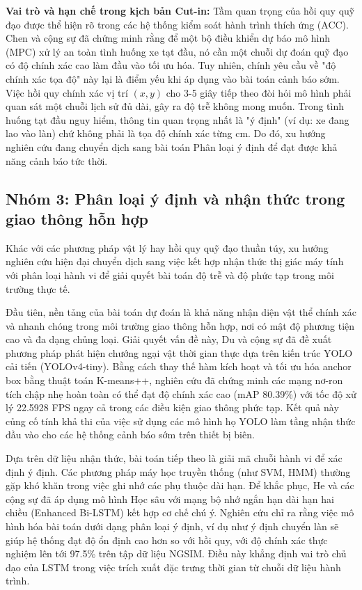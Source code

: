 	\textbf{Vai trò và hạn chế trong kịch bản Cut-in:}
	Tầm quan trọng của hồi quy quỹ đạo được thể hiện rõ trong các hệ thống kiểm soát hành trình thích ứng (ACC). Chen và cộng sự \cite{Chen2021} đã chứng minh rằng để một bộ điều khiển dự báo mô hình (MPC) xử lý an toàn tình huống xe tạt đầu, nó cần một chuỗi dự đoán quỹ đạo có độ chính xác cao làm đầu vào tối ưu hóa.
	Tuy nhiên, chính yêu cầu về "độ chính xác tọa độ" này lại là điểm yếu khi áp dụng vào bài toán cảnh báo sớm. Việc hồi quy chính xác vị trí $(x, y)$ cho 3-5 giây tiếp theo đòi hỏi mô hình phải quan sát một chuỗi lịch sử đủ dài, gây ra độ trễ không mong muốn. Trong tình huống tạt đầu nguy hiểm, thông tin quan trọng nhất là "ý định" (ví dụ: xe đang lao vào làn) chứ không phải là tọa độ chính xác từng cm. Do đó, xu hướng nghiên cứu đang chuyển dịch sang bài toán Phân loại ý định để đạt được khả năng cảnh báo tức thời.

	\subsection{Nhóm 3: Phân loại ý định và nhận thức trong giao thông hỗn hợp}
	Khác với các phương pháp vật lý hay hồi quy quỹ đạo thuần túy, xu hướng nghiên cứu hiện đại chuyển dịch sang việc kết hợp nhận thức thị giác máy tính với phân loại hành vi để giải quyết bài toán độ trễ và độ phức tạp trong môi trường thực tế.
	
	Đầu tiên, nền tảng của bài toán dự đoán là khả năng nhận diện vật thể chính xác và nhanh chóng trong môi trường giao thông hỗn hợp, nơi có mật độ phương tiện cao và đa dạng chủng loại. Giải quyết vấn đề này, Du và cộng sự \cite{Du2022ImprovedRT} đã đề xuất phương pháp phát hiện chướng ngại vật thời gian thực dựa trên kiến trúc YOLO cải tiến (YOLOv4-tiny). Bằng cách thay thế hàm kích hoạt và tối ưu hóa anchor box bằng thuật toán K-means++, nghiên cứu đã chứng minh các mạng nơ-ron tích chập nhẹ hoàn toàn có thể đạt độ chính xác cao (mAP 80.39\%) với tốc độ xử lý 22.5928 FPS ngay cả trong các điều kiện giao thông phức tạp. Kết quả này củng cố tính khả thi của việc sử dụng các mô hình họ YOLO làm tầng nhận thức đầu vào cho các hệ thống cảnh báo sớm trên thiết bị biên.
	
	Dựa trên dữ liệu nhận thức, bài toán tiếp theo là giải mã chuỗi hành vi để xác định ý định. Các phương pháp máy học truyền thống (như SVM, HMM) thường gặp khó khăn trong việc ghi nhớ các phụ thuộc dài hạn. Để khắc phục, He và các cộng sự \cite{He2023VehicleDI} đã áp dụng mô hình Học sâu với mạng bộ nhớ ngắn hạn dài hạn hai chiều (Enhanced Bi-LSTM) kết hợp cơ chế chú ý. Nghiên cứu chỉ ra rằng việc mô hình hóa bài toán dưới dạng phân loại ý định, ví dụ như ý định chuyển làn sẽ giúp hệ thống đạt độ ổn định cao hơn so với hồi quy, với độ chính xác thực nghiệm lên tới 97.5\% trên tập dữ liệu NGSIM. Điều này khẳng định vai trò chủ đạo của LSTM trong việc trích xuất đặc trưng thời gian từ chuỗi dữ liệu hành trình.
	
